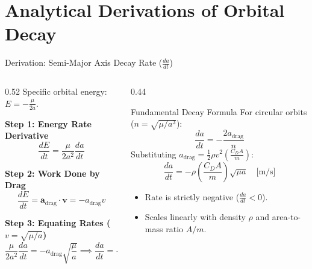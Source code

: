 \documentclass[aspectratio=169,11pt]{beamer}
\begin{document}
\section{Analytical Derivations of Orbital Decay}

\begin{frame}{Derivation: Semi-Major Axis Decay Rate ($\frac{da}{dt}$)}
    \begin{columns}[t]
        \begin{column}{0.52\textwidth}
            Specific orbital energy: $E = -\frac{\mu}{2a}$.
            
            \smallskip
            \textbf{Step 1: Energy Rate Derivative}
            \begin{equation*}
                \frac{dE}{dt} = \frac{\mu}{2a^2} \frac{da}{dt}
            \end{equation*}

            \textbf{Step 2: Work Done by Drag}
            \begin{equation*}
                \frac{dE}{dt} = \mathbf{a}_{\text{drag}} \cdot \mathbf{v} = -a_{\text{drag}} v
            \end{equation*}

            \textbf{Step 3: Equating Rates ($v = \sqrt{\mu/a}$)}
            \begin{equation*}
                \frac{\mu}{2a^2} \frac{da}{dt} = -a_{\text{drag}} \sqrt{\frac{\mu}{a}} \implies \frac{da}{dt} = -\frac{2 a_{\text{drag}}}{n}
            \end{equation*}
        \end{column}

        \begin{column}{0.44\textwidth}
            \begin{block}{Fundamental Decay Formula}
                For circular orbits ($n = \sqrt{\mu/a^3}$):
                \begin{equation*}
                    \frac{da}{dt} = -\frac{2 a_{\text{drag}}}{n}
                \end{equation*}
                Substituting $a_{\text{drag}} = \frac{1}{2}\rho v^2 \left(\frac{C_D A}{m}\right)$:
                \begin{equation*}
                    \frac{da}{dt} = -\rho \left(\frac{C_D A}{m}\right) \sqrt{\mu a} \quad \text{[m/s]}
                \end{equation*}
            \end{block}

            \begin{itemize}
                \item \small Rate is strictly negative ($\frac{da}{dt} < 0$).
                \item \small Scales linearly with density $\rho$ and area-to-mass ratio $A/m$.
            \end{itemize}
        \end{column}
    \end{columns}
\end{frame}
\end{document}
